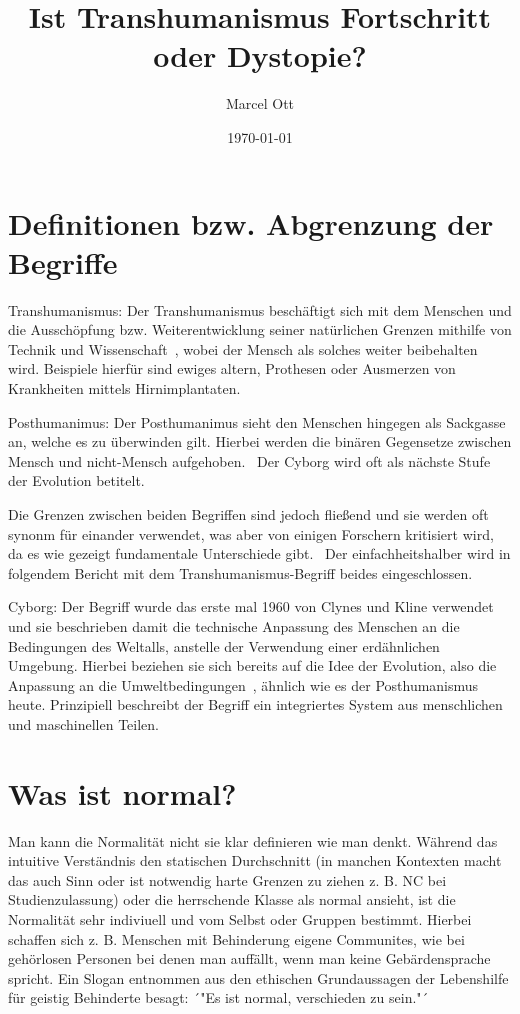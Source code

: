 \documentclass[a4paper,
DIV=13,
12pt,
BCOR=10mm,
department=FakEI,
twoside,
parskip=half,
automark,
]{OTHRartcl}
\date{\today}
\title{Ist Transhumanismus Fortschritt oder Dystopie?}
\author{Marcel Ott}
\begin{document}
\maketitle

\section*{Definitionen bzw. Abgrenzung der Begriffe}

Transhumanismus: Der Transhumanismus beschäftigt sich mit dem Menschen und die Ausschöpfung bzw. Weiterentwicklung seiner natürlichen Grenzen mithilfe von Technik und Wissenschaft~\cite{Merzlyakov2022},
wobei der Mensch als solches weiter beibehalten wird. Beispiele hierfür sind ewiges altern, Prothesen oder Ausmerzen von Krankheiten mittels Hirnimplantaten.

Posthumanimus: Der Posthumanimus sieht den Menschen hingegen als Sackgasse an, welche es zu überwinden gilt. Hierbei werden die binären Gegensetze zwischen Mensch und nicht-Mensch aufgehoben.~\cite{Merzlyakov2022}
Der Cyborg wird oft als nächste Stufe der Evolution betitelt.

Die Grenzen zwischen beiden Begriffen sind jedoch fließend und sie werden oft synonm für einander verwendet, was aber von einigen Forschern kritisiert wird, da es wie gezeigt fundamentale Unterschiede gibt.~\cite{Merzlyakov2022}
Der ein­fach­heits­hal­ber wird in folgendem Bericht mit dem Transhumanismus-Begriff beides eingeschlossen.

Cyborg: Der Begriff wurde das erste mal 1960 von Clynes und Kline verwendet und sie beschrieben damit die technische Anpassung des Menschen an die Bedingungen des Weltalls, anstelle der Verwendung 
einer erdähnlichen Umgebung. Hierbei beziehen sie sich bereits auf die Idee der Evolution, also die Anpassung an die Umweltbedingungen~\cite{clynes1960cyborgs}, ähnlich wie es der Posthumanismus heute.
Prinzipiell beschreibt der Begriff ein integriertes System aus menschlichen und maschinellen Teilen.~\cite{warwick2000cyborg}


\section*{Was ist normal?}
Man kann die Normalität nicht sie klar definieren wie man denkt. Während das intuitive Verständnis den statischen Durchschnitt (in manchen Kontexten macht das auch Sinn oder ist notwendig harte Grenzen zu ziehen z. B. NC bei Studienzulassung)
oder die herrschende Klasse als normal ansieht, ist die Normalität sehr indiviuell und vom Selbst oder Gruppen bestimmt.\cite{schildmann1999normal} Hierbei schaffen sich z. B. Menschen mit Behinderung eigene Communites, wie bei gehörlosen
Personen bei denen man auffällt, wenn man keine Gebärdensprache spricht. Ein Slogan entnommen aus den ethischen Grundaussagen der Lebenshilfe für geistig Behinderte besagt: ´"Es ist normal, verschieden zu sein."´~\cite{lebenshilfeFlyer}
\end{document}
